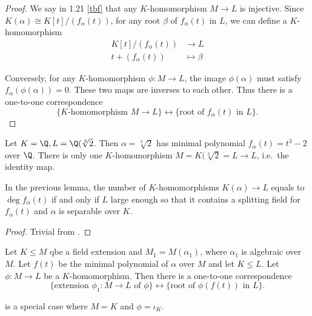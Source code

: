 \documentclass[a4paper]{article}
\begin{document}
\begin{proof}
  We say in 1.21 \ref{tbf} that any \(K\)-homomorphism \(M \to L\) is injective. Since \(K(\alpha) \cong K[t]/(f_\alpha(t))\), for any root \(\beta\) of \(f_\alpha(t)\) in \(L\), we can define a \(K\)-homomorphism
  \begin{align*}
    K[t]/(f_\alpha(t)) &\to L \\
    t + (f_\alpha(t)) &\mapsto \beta
  \end{align*}

  Conversely, for any \(K\)-homomorphism \(\phi: M \to L\), the image \(\phi(\alpha)\) must satisfy \(f_\alpha(\phi(\alpha)) = 0\). These two maps are inverses to each other. Thus there is a one-to-one correspondence
  \[
    \{K\text{-homomorphism } M \to L\} \leftrightarrow \{\text{root of } f_\alpha(t) \text{ in } L\}.
  \]
\end{proof}

\begin{eg}
  Let \(K = \Q, L = \Q(\sqrt[3]{2}\). Then \(\alpha = \sqrt[3]{2}\) has minimal polynomial \(f_\alpha(t) = t^3 - 2\) over \(\Q\). There is only one \(K\)-homomorphism \(M = K(\sqrt[3]{2} = L \to L\), i.e.\ the identity map.
\end{eg}

\begin{corollary}
  In the previous lemma, the number of \(K\)-homomorphisms \(K(\alpha) \to L\) equals to \(\deg f_\alpha(t)\) if and only if \(L\) large enough so that it contains a splitting field for \(f_\alpha(t)\) and \(\alpha\) is separable over \(K\).
\end{corollary}

\begin{proof}
  Trivial from .
\end{proof}

\begin{lemma}
  Let \(K \leq M\) qbe a field extension and \(M_1 = M(\alpha_1)\), where \(\alpha_1\) is algebraic over \(M\). Let \(f(t)\) be the minimal polynomial of \(\alpha\) over \(M\) and let \(K \leq L\). Let \(\phi: M \to L\) be a \(K\)-homomorphism. Then there is a one-to-one correspondence
  \[
    \{\text{extension } \phi_1: M \to L \text{ of } \phi\} \leftrightarrow \{\text{root of } \phi(f(t)) \text{ in } L\}.
  \]
\end{lemma}

\begin{remark}
   is a special case where \(M = K\) and \(\phi = \iota_K\).
\end{remark}
\end{document}
